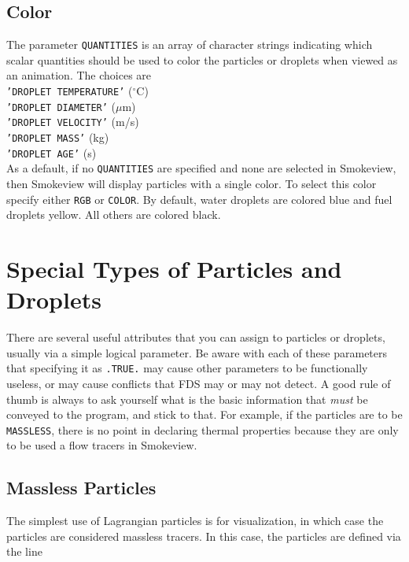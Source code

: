 \documentclass[11pt]{book}
\newcommand{\ct}{\tt\small}
\begin{document}
\subsection{Color}
\label{info:particle_quantities}

The parameter {\ct QUANTITIES} is an array of character strings indicating which
scalar quantities should be used to color the particles or droplets when viewed as an
animation. The choices are \\
{\ct 'DROPLET TEMPERATURE'} ($^\circ$C) \\
{\ct 'DROPLET DIAMETER'} ($\mu$m) \\
{\ct 'DROPLET VELOCITY'} (m/s) \\
{\ct 'DROPLET MASS'} (kg) \\
{\ct 'DROPLET AGE'} (s) \\
As a default, if no {\ct QUANTITIES} are specified and none are selected in Smokeview, then
Smokeview will display particles with a single color.  To select this color specify either {\ct RGB} or
{\ct COLOR}. By default, water droplets are colored blue and fuel droplets yellow. All others are colored black.



\clearpage

\section{Special Types of Particles and Droplets}
\label{part_type}

There are several useful attributes that you can assign to particles or droplets, usually via a simple logical parameter. Be aware with each of these parameters that
specifying it as {\ct .TRUE.} may cause other parameters to be functionally useless, or may cause conflicts that FDS may or may not detect. A good rule of thumb is always to
ask yourself what is the basic information that {\em must} be conveyed to the program, and stick to that. For example, if the particles are to be {\ct MASSLESS}, there is no
point in declaring thermal properties because they are only to be used a flow tracers in Smokeview.

\subsection{Massless Particles}
\label{info:MASSLESS}

The simplest use of Lagrangian particles is for visualization, in which case the
particles are considered massless tracers. In this case, the particles are
defined via the line
\end{document}
